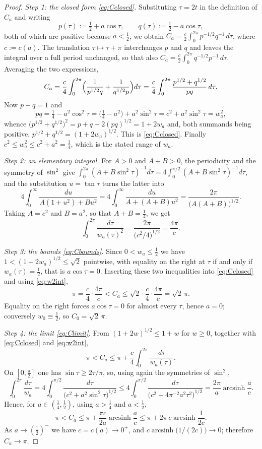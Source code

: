 \documentclass[10pt,a4paper]{amsart}
\begin{document}
\begin{proof}
\emph{Step 1: the closed form \eqref{eq:Cclosed}.} Substituting $\tau=2t$ in the definition of $C_a$ and writing
\[
p(\tau):=\tfrac12+a\cos\tau,\qquad q(\tau):=\tfrac12-a\cos\tau,
\]
both of which are positive because $a<\tfrac12$, we obtain $C_a=\tfrac{c}{2}\int_0^{2\pi}p^{-1/2}q^{-1}\,d\tau$, where $c:=c(a)$. The translation $\tau\mapsto\tau+\pi$ interchanges $p$ and $q$ and leaves the integral over a full period unchanged, so that also $C_a=\tfrac{c}{2}\int_0^{2\pi}q^{-1/2}p^{-1}\,d\tau$. Averaging the two expressions,
\[
C_a=\frac{c}{4}\int_0^{2\pi}\Bigl(\frac{1}{p^{1/2}q}+\frac{1}{q^{1/2}p}\Bigr)d\tau
=\frac{c}{4}\int_0^{2\pi}\frac{p^{1/2}+q^{1/2}}{pq}\,d\tau .
\]
Now $p+q=1$ and
\[
pq=\tfrac14-a^2\cos^2\tau=\bigl(\tfrac14-a^2\bigr)+a^2\sin^2\tau=c^2+a^2\sin^2\tau=w_a^2 ,
\]
whence $\bigl(p^{1/2}+q^{1/2}\bigr)^2=p+q+2(pq)^{1/2}=1+2w_a$ and, both summands being positive, $p^{1/2}+q^{1/2}=(1+2w_a)^{1/2}$. This is \eqref{eq:Cclosed}. Finally $c^2\leq w_a^2\leq c^2+a^2=\tfrac14$, which is the stated range of $w_a$.

\emph{Step 2: an elementary integral.} For $A>0$ and $A+B>0$, the periodicity and the symmetry of $\sin^2$ give $\int_0^{2\pi}(A+B\sin^2\tau)^{-1}d\tau=4\int_0^{\pi/2}(A+B\sin^2\tau)^{-1}d\tau$, and the substitution $u=\tan\tau$ turns the latter into
\[
4\int_0^{\infty}\frac{du}{A(1+u^2)+Bu^2}=4\int_0^{\infty}\frac{du}{A+(A+B)u^2}=\frac{2\pi}{\bigl(A(A+B)\bigr)^{1/2}} .
\]
Taking $A=c^2$ and $B=a^2$, so that $A+B=\tfrac14$, we get
\begin{equation}\label{eq:w2int}
\int_0^{2\pi}\frac{d\tau}{w_a(\tau)^2}=\frac{2\pi}{\bigl(c^2/4\bigr)^{1/2}}=\frac{4\pi}{c} .
\end{equation}

\emph{Step 3: the bounds \eqref{eq:Cbounds}.} Since $0<w_a\leq\tfrac12$ we have $1<(1+2w_a)^{1/2}\leq\sqrt2$ pointwise, with equality on the right at $\tau$ if and only if $w_a(\tau)=\tfrac12$, that is $a\cos\tau=0$. Inserting these two inequalities into \eqref{eq:Cclosed} and using \eqref{eq:w2int},
\[
\pi=\frac{c}{4}\cdot\frac{4\pi}{c}<C_a\leq\sqrt2\cdot\frac{c}{4}\cdot\frac{4\pi}{c}=\sqrt2\,\pi .
\]
Equality on the right forces $a\cos\tau=0$ for almost every $\tau$, hence $a=0$; conversely $w_0\equiv\tfrac12$, so $C_0=\sqrt2\,\pi$.

\emph{Step 4: the limit \eqref{eq:Climit}.} From $(1+2w)^{1/2}\leq 1+w$ for $w\geq 0$, together with \eqref{eq:Cclosed} and \eqref{eq:w2int},
\[
\pi<C_a\leq\pi+\frac{c}{4}\int_0^{2\pi}\frac{d\tau}{w_a(\tau)} .
\]
On $[0,\tfrac\pi2]$ one has $\sin\tau\geq 2\tau/\pi$, so, using again the symmetries of $\sin^2$,
\[
\int_0^{2\pi}\frac{d\tau}{w_a}=4\int_0^{\pi/2}\frac{d\tau}{\bigl(c^2+a^2\sin^2\tau\bigr)^{1/2}}
\leq 4\int_0^{\pi/2}\frac{d\tau}{\bigl(c^2+4\pi^{-2}a^2\tau^2\bigr)^{1/2}}
=\frac{2\pi}{a}\operatorname{arcsinh}\frac{a}{c} .
\]
Hence, for $a\in(\tfrac14,\tfrac12)$, using $a>\tfrac14$ and $a<\tfrac12$,
\[
\pi<C_a\leq\pi+\frac{\pi c}{2a}\operatorname{arcsinh}\frac{a}{c}\leq\pi+2\pi\,c\operatorname{arcsinh}\frac{1}{2c} .
\]
As $a\to(\tfrac12)^-$ we have $c=c(a)\to 0^+$, and $c\operatorname{arcsinh}\bigl(1/(2c)\bigr)\to 0$; therefore $C_a\to\pi$.
\end{proof}
\end{document}
